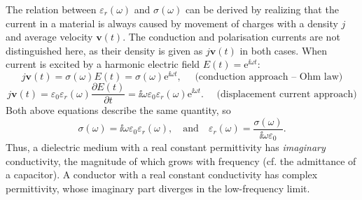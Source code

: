 The relation between $\varepsilon_r(\omega)$ and $\sigma(\omega)$
 can be derived by realizing that the current in a material is always caused by movement of charges with a density $j$ and average velocity $\mathbf{v}(t)$. The conduction and polarisation currents are not distinguished here, as their density is given as $j \mathbf{v}(t)$ in both cases. When current is excited by a harmonic electric field $E(t) = \mathrm{e}^{\ii\omega t}$: %
\begin{equation} j \mathbf{v}(t) = \sigma(\omega) E(t) = \sigma(\omega) \mathrm{e}^{\ii\omega t}, \quad\text{ (conduction approach -- Ohm law)} \label{eq_rho_n1}\end{equation}
\begin{equation} j \mathbf{v}(t) = \varepsilon_0 \varepsilon_r(\omega) \frac{\partial E(t)}{\partial t} = \ii \omega \varepsilon_0 \varepsilon_r(\omega) \mathrm{e}^{\ii\omega t} . \quad\text{ (displacement current approach)} \label{eq_rho_n2}\end{equation}
Both above equations describe the same quantity, so
\begin{equation} \sigma(\omega) = \ii \omega \varepsilon_0 \varepsilon_r(\omega), \quad  \text{and} \quad  \varepsilon_r(\omega)  = \frac{\sigma(\omega)}{\ii \omega \varepsilon_0}. \label{eq_drude_sigma}\end{equation}
Thus, a dielectric medium with a real constant permittivity has \textit{imaginary} conductivity, the magnitude of which grows with frequency (cf. the admittance of a capacitor). A conductor with a real constant conductivity has complex permittivity, whose imaginary part diverges in the low-frequency limit. 

